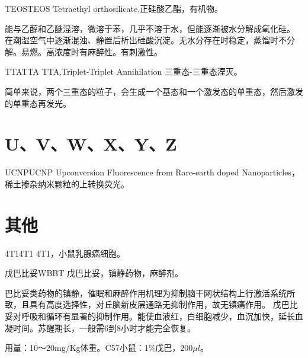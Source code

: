 \documentclass[cn,11pt,chinese]{elegantbook}
\begin{document}
\begin{theorem}{TEOS}{TEOS} 
  Tetraethyl orthosilicate,正硅酸乙酯，有机物。
  
  能与乙醇和乙醚混溶，微溶于苯，几乎不溶于水，但能逐渐被水分解成氧化硅。
  在潮湿空气中逐渐混浊、静置后析出硅酸沉淀。无水分存在时稳定，蒸馏时不分解。易燃。高浓度时有麻醉性。有刺激性。
\end{theorem}  


\begin{theorem}{TTA}{TTA} 
  TTA,Triplet-Triplet Annihilation 三重态-三重态湮灭。
 
 简单来说，两个三重态的粒子，会生成一个基态和一个激发态的单重态，然后激发的单重态再发光。 
\end{theorem}  

\section{U、V、W、X、Y、Z}

\begin{theorem}{UCNP}{UCNP} 
  Upconversion Fluorescence from Rare-earth doped Nanoparticles，稀土掺杂纳米颗粒的上转换荧光。
  \end{theorem}  
\section{其他}

\begin{theorem}{4T1}{4T1} 
4T1，小鼠乳腺癌细胞。
  \end{theorem}  

  \begin{theorem}{戊巴比妥}{WBBT} 
   戊巴比妥，镇静药物，麻醉剂。

    巴比妥类药物的镇静，催眠和麻醉作用机理为抑制脑干网状结构上行激活系统所致，且具有高度选择性，对丘脑新皮层通路无抑制作用，故无镇痛作用。
    戊巴比妥对呼吸和循环有显著的抑制作用。能使血液红，白细胞减少，血沉加快，延长血凝时间。苏醒期长，一般需6到8小时才能完全恢复。

    用量：10～20mg/Kg体重。C57小鼠：1\%戊巴，$200 \mu l$。
\end{theorem}  
 
\end{document}
